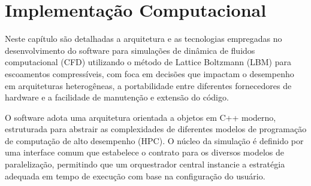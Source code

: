 
\chapter{Implementação Computacional}\label{ch:implementacao-computacional}




Neste capítulo são detalhadas a arquitetura e as tecnologias empregadas no desenvolvimento do software para simulações de dinâmica de fluidos computacional (CFD) utilizando o método de Lattice Boltzmann (LBM) para escoamentos compressíveis, com foca em decisões que impactam o desempenho em arquiteturas heterogêneas, a portabilidade entre diferentes fornecedores de hardware e a facilidade de manutenção e extensão do código.

O software adota uma arquitetura orientada a objetos em C++ moderno, estruturada para abstrair as complexidades de diferentes modelos de programação de computação de alto desempenho (HPC). O núcleo da simulação é definido por uma interface comum que estabelece o contrato para os diversos modelos de paralelização, permitindo que um orquestrador central instancie a estratégia adequada em tempo de execução com base na configuração do usuário.

